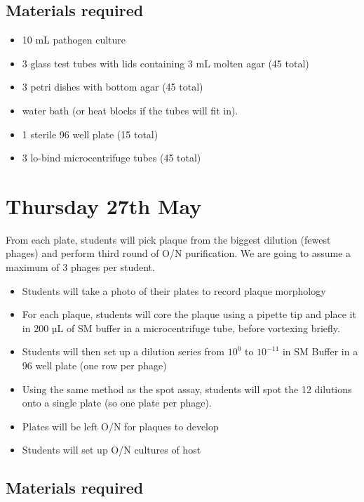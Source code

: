 \documentclass[
]{book}
\providecommand{\tightlist}{%
  \setlength{\itemsep}{0pt}\setlength{\parskip}{0pt}}
\begin{document}
\hypertarget{materials-required-2}{%
\subsection{Materials required}\label{materials-required-2}}

\begin{itemize}
\tightlist
\item
  10 mL pathogen culture
\item
  3 glass test tubes with lids containing 3 mL molten agar (45 total)
\item
  3 petri dishes with bottom agar (45 total)
\item
  water bath (or heat blocks if the tubes will fit in).
\item
  1 sterile 96 well plate (15 total)
\item
  3 lo-bind microcentrifuge tubes (45 total)
\end{itemize}

\hypertarget{thursday-27th-may}{%
\section{Thursday 27th May}\label{thursday-27th-may}}

From each plate, students will pick plaque from the biggest dilution (fewest phages) and perform third round of O/N purification. We are going to assume a maximum of 3 phages per student.

\begin{itemize}
\tightlist
\item
  Students will take a photo of their plates to record plaque morphology
\item
  For each plaque, students will core the plaque using a pipette tip and place it in 200 µL of SM buffer in a microcentrifuge tube, before vortexing briefly.
\item
  Students will then set up a dilution series from \(10^{0}\) to \(10^{-11}\) in SM Buffer in a 96 well plate (one row per phage)
\item
  Using the same method as the spot assay, students will spot the 12 dilutions onto a single plate (so one plate per phage).
\item
  Plates will be left O/N for plaques to develop
\item
  Students will set up O/N cultures of host
\end{itemize}

\hypertarget{materials-required-3}{%
\subsection{Materials required}\label{materials-required-3}}
\end{document}
